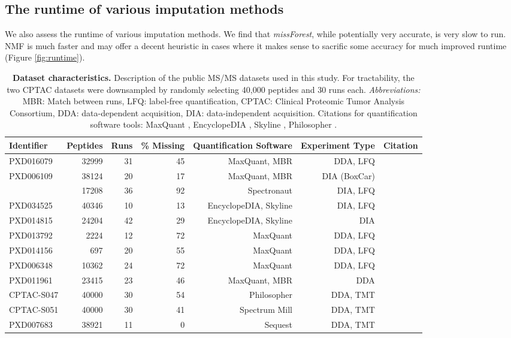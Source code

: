 \documentclass{article}
\newcommand{\fixme}[1]{{\color{red}{#1}}}
\begin{document}
\subsection{The runtime of various imputation methods}

We also assess the runtime of various imputation methods. We find that \textit{missForest}, while potentially very accurate, is very slow to run. NMF is much faster and may offer a decent heuristic in cases where it makes sense to sacrific some accuracy for much improved runtime (Figure \ref{fig:runtime}).

\begin{table}
  \centering
  \normalsize
  \begin{tabular}{lrrrrrr}
    \hline
    Identifier & Peptides & Runs & \% Missing & Quantification Software & Experiment Type & Citation \\
    \hline
    PXD016079 & 32999 & 31 & 45 & MaxQuant, MBR & DDA, LFQ & \cite{pxd016079} \\
    PXD006109 & 38124 & 20 & 17 & MaxQuant, MBR & DIA (BoxCar) & \cite{pxd006109} \\
    \fixme{PXD014525} & 17208 & 36 & 92 & Spectronaut & DIA, LFQ & \cite{pxd014525} \\
    PXD034525 & 40346 & 10 & 13 & EncyclopeDIA, Skyline & DIA, LFQ & \cite{smtg-maccoss} \\
    PXD014815 & 24204 & 42 & 29 & EncyclopeDIA, Skyline & DIA & \cite{matrix-matched-calib} \\
    PXD013792 & 2224 & 12 & 72 & MaxQuant & DDA, LFQ & \cite{pxd013792} \\
    PXD014156 & 697 & 20 & 55 & MaxQuant & DDA, LFQ & \cite{pxd014156} \\
    PXD006348 & 10362 & 24 & 72 & MaxQuant & DDA, LFQ & \cite{pxd006348} \\
    PXD011961 & 23415 & 23 & 46 & MaxQuant, MBR & DDA & \cite{pxd011961} \\
    CPTAC-S047 & 40000 & 30 & 54 & Philosopher & DDA, TMT & \cite{CPTAC-S047} \\
    CPTAC-S051 & 40000 & 30 & 41 & Spectrum Mill & DDA, TMT & \cite{CPTAC-S051} \\
    PXD007683 & 38921 & 11 & 0 & Sequest & DDA, TMT & \cite{pxd007683} \\
    \hline
  \end{tabular}
  \caption{{\bf Dataset characteristics.} Description of the public MS/MS datasets used in this study. For tractability, the two CPTAC datasets were downsampled by randomly selecting 40,000 peptides and 30 runs each. \textit{Abbreviations:} MBR: Match between runs, LFQ: label-free quantification, CPTAC: Clinical Proteomic Tumor Analysis Consortium, DDA: data-dependent acquisition, DIA: data-independent acquisition. Citations for quantification software tools: MaxQuant \cite{MaxQuant}, EncyclopeDIA \cite{chromatogram-DIA}, Skyline \cite{skyline}, Philosopher \cite{philosopher}.
    \label{tab:data-description}}
\end{table}
\end{document}
